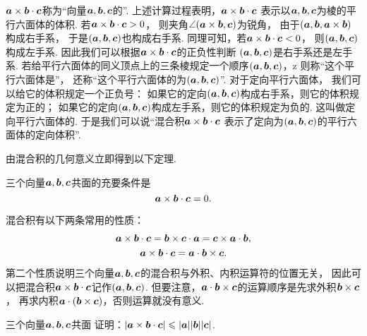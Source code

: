 \(\boldsymbol{a}\times\boldsymbol{b}\cdot\boldsymbol{c}\)称为“向量\(\boldsymbol{a},\boldsymbol{b},\boldsymbol{c}\)的”.
上述计算过程表明，\(\boldsymbol{a}\times\boldsymbol{b}\cdot\boldsymbol{c}\)
表示以\(\boldsymbol{a},\boldsymbol{b},\boldsymbol{c}\)为棱的平行六面体的体积.
若\(\boldsymbol{a}\times\boldsymbol{b}\cdot\boldsymbol{c}>0\)，
则夹角\(\angle(\boldsymbol{a}\times\boldsymbol{b},\boldsymbol{c})\)为锐角，
由于\((\boldsymbol{a},\boldsymbol{b},\boldsymbol{a}\times\boldsymbol{b})\)构成右手系，
于是\((\boldsymbol{a},\boldsymbol{b},\boldsymbol{c})\)也构成右手系.
同理可知，若\(\boldsymbol{a}\times\boldsymbol{b}\cdot\boldsymbol{c}<0\)，
则\((\boldsymbol{a},\boldsymbol{b},\boldsymbol{c})\)构成左手系.
因此我们可以根据\(\boldsymbol{a}\times\boldsymbol{b}\cdot\boldsymbol{c}\)的正负性判断
\((\boldsymbol{a},\boldsymbol{b},\boldsymbol{c})\)是右手系还是左手系.
若给平行六面体的同义顶点上的三条棱规定一个顺序\((\boldsymbol{a},\boldsymbol{b},\boldsymbol{c})\)，z
则称“这个平行六面体是”，
还称“这个平行六面体的为\((\boldsymbol{a},\boldsymbol{b},\boldsymbol{c})\)”.
对于定向平行六面体，
我们可以给它的体积规定一个正负号：
如果它的定向\((\boldsymbol{a},\boldsymbol{b},\boldsymbol{c})\)构成右手系，则它的体积规定为正的；
如果它的定向\((\boldsymbol{a},\boldsymbol{b},\boldsymbol{c})\)构成左手系，则它的体积规定为负的.
这叫做定向平行六面体的.
于是我们可以说“混合积\(\boldsymbol{a}\times\boldsymbol{b}\cdot\boldsymbol{c}\)
表示了定向为\((\boldsymbol{a},\boldsymbol{b},\boldsymbol{c})\)的平行六面体的定向体积”.

由混合积的几何意义立即得到以下定理.
\begin{theorem}
三个向量\(\boldsymbol{a},\boldsymbol{b},\boldsymbol{c}\)共面的充要条件是\[
	\boldsymbol{a}\times\boldsymbol{b}\cdot\boldsymbol{c} = 0.
\]
\end{theorem}

混合积有以下两条常用的性质：
\begin{gather}
	\boldsymbol{a}\times\boldsymbol{b}\cdot\boldsymbol{c}
	= \boldsymbol{b}\times\boldsymbol{c}\cdot\boldsymbol{a}
	= \boldsymbol{c}\times\boldsymbol{a}\cdot\boldsymbol{b}, \\
	\boldsymbol{a}\times\boldsymbol{b}\cdot\boldsymbol{c}
	= \boldsymbol{a}\cdot\boldsymbol{b}\times\boldsymbol{c}.
\end{gather}
第二个性质说明三个向量\(\boldsymbol{a},\boldsymbol{b},\boldsymbol{c}\)的混合积与外积、内积运算符的位置无关，
因此可以把混合积\(\boldsymbol{a}\times\boldsymbol{b}\cdot\boldsymbol{c}\)记作\((\boldsymbol{a},\boldsymbol{b},\boldsymbol{c})\).
但要注意，\(\boldsymbol{a}\cdot\boldsymbol{b}\times\boldsymbol{c}\)的运算顺序是先求外积\(\boldsymbol{b}\times\boldsymbol{c}\)，
再求内积\(\boldsymbol{a}\cdot(\boldsymbol{b}\times\boldsymbol{c})\)，否则运算就没有意义.

\begin{example}
三个向量\(\boldsymbol{a},\boldsymbol{b},\boldsymbol{c}\)共面
证明：\(\abs{\boldsymbol{a}\times\boldsymbol{b}\cdot\boldsymbol{c}}
\leqslant \abs{\boldsymbol{a}} \abs{\boldsymbol{b}} \abs{\boldsymbol{c}}\).
\end{example}

